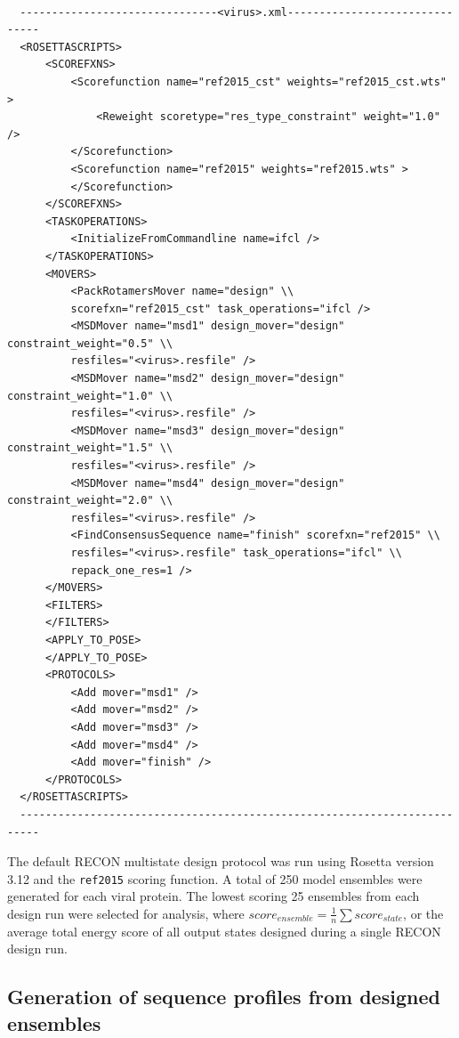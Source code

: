 \documentclass[10pt]{article}
\begin{document}
\begin{lstlisting}
  
  -------------------------------<virus>.xml-------------------------------
  <ROSETTASCRIPTS>
      <SCOREFXNS>
          <Scorefunction name="ref2015_cst" weights="ref2015_cst.wts" >
              <Reweight scoretype="res_type_constraint" weight="1.0" />
          </Scorefunction>
          <Scorefunction name="ref2015" weights="ref2015.wts" >
          </Scorefunction>
      </SCOREFXNS>
      <TASKOPERATIONS>
          <InitializeFromCommandline name=ifcl />
      </TASKOPERATIONS>
      <MOVERS>
          <PackRotamersMover name="design" \\
          scorefxn="ref2015_cst" task_operations="ifcl />
          <MSDMover name="msd1" design_mover="design" constraint_weight="0.5" \\
          resfiles="<virus>.resfile" />
          <MSDMover name="msd2" design_mover="design" constraint_weight="1.0" \\
          resfiles="<virus>.resfile" />
          <MSDMover name="msd3" design_mover="design" constraint_weight="1.5" \\
          resfiles="<virus>.resfile" />
          <MSDMover name="msd4" design_mover="design" constraint_weight="2.0" \\
          resfiles="<virus>.resfile" />
          <FindConsensusSequence name="finish" scorefxn="ref2015" \\
          resfiles="<virus>.resfile" task_operations="ifcl" \\
          repack_one_res=1 />
      </MOVERS>
      <FILTERS>
      </FILTERS>
      <APPLY_TO_POSE>
      </APPLY_TO_POSE>
      <PROTOCOLS>
          <Add mover="msd1" />
          <Add mover="msd2" />
          <Add mover="msd3" />
          <Add mover="msd4" />
          <Add mover="finish" />
      </PROTOCOLS>
  </ROSETTASCRIPTS>
  -------------------------------------------------------------------------
\end{lstlisting}

The default RECON multistate design protocol was run using Rosetta version 3.12 and the \texttt{ref2015} scoring function. A total of 250 model ensembles were generated for each viral protein. The lowest scoring 25 ensembles from each design run were selected for analysis, where $score_{ensemble}=\frac{1}{n}\sum score_{state}$, or the average total energy score of all output states designed during a single RECON design run. 

\subsection{Generation of sequence profiles from designed ensembles}\label{sec:design-profiles}
\end{document}
